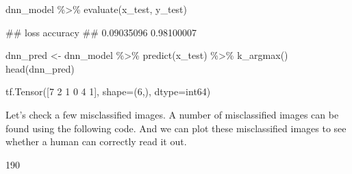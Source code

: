 \documentclass[
  12pt,
]{krantz}
\makeatletter
\newenvironment{Shaded}{\begin{snugshade}}{\end{snugshade}}
\newcommand{\DocumentationTok}[1]{\textcolor[rgb]{0.37,0.37,0.37}{\textbf{\textit{#1}}}}
\newcommand{\FunctionTok}[1]{\textcolor[rgb]{0,0,0}{#1}}
\newcommand{\NormalTok}[1]{#1}
\newcommand{\OtherTok}[1]{\textcolor[rgb]{0.37,0.37,0.37}{#1}}
\newcommand{\SpecialCharTok}[1]{\textcolor[rgb]{0,0,0}{#1}}
\newenvironment{kframe}{%
\medskip{}
\setlength{\fboxsep}{.8em}
 \def\at@end@of@kframe{}%
 \ifinner\ifhmode%
  \def\at@end@of@kframe{\end{minipage}}%
  \begin{minipage}{\columnwidth}%
 \fi\fi%
 \def\FrameCommand##1{\hskip\@totalleftmargin \hskip-\fboxsep
 \colorbox{shadecolor}{##1}\hskip-\fboxsep
     \hskip-\linewidth \hskip-\@totalleftmargin \hskip\columnwidth}%
 \MakeFramed {\advance\hsize-\width
   \@totalleftmargin\z@ \linewidth\hsize
   \@setminipage}}%
 {\par\unskip\endMakeFramed%
 \at@end@of@kframe}
\renewenvironment{Shaded}{\begin{kframe}}{\end{kframe}}
\makeatother
\begin{document}
\begin{Shaded}
\begin{Highlighting}[]
\NormalTok{dnn\_model }\SpecialCharTok{\%\textgreater{}\%} \FunctionTok{evaluate}\NormalTok{(x\_test, y\_test)}
\end{Highlighting}
\end{Shaded}

\begin{Shaded}
\begin{Highlighting}[]
\NormalTok{\#\#       loss   accuracy }
\NormalTok{\#\# 0.09035096 0.98100007}
\end{Highlighting}
\end{Shaded}

\begin{Shaded}
\begin{Highlighting}[]
\NormalTok{dnn\_pred }\OtherTok{\textless{}{-}}\NormalTok{ dnn\_model }\SpecialCharTok{\%\textgreater{}\%}
  \FunctionTok{predict}\NormalTok{(x\_test) }\SpecialCharTok{\%\textgreater{}\%}
  \FunctionTok{k\_argmax}\NormalTok{()}
\FunctionTok{head}\NormalTok{(dnn\_pred)}
\end{Highlighting}
\end{Shaded}

\begin{Shaded}
\begin{Highlighting}[]
\NormalTok{tf.Tensor([7 2 1 0 4 1], shape=(6,), dtype=int64)}
\end{Highlighting}
\end{Shaded}

Let's check a few misclassified images. A number of misclassified images can be found using the following code. And we can plot these misclassified images to see whether a human can correctly read it out.

\begin{Shaded}
\end{Shaded}

\begin{Shaded}
\begin{Highlighting}[]
\NormalTok{[1] 190}
\end{Highlighting}
\end{Shaded}
\end{document}
